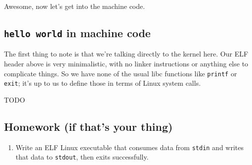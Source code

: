 \documentclass{article}
\begin{document}
  Awesome, now let's get into the machine code.

  \subsection{{\tt hello world} in machine code}
  The first thing to note is that we're talking directly to the kernel here. Our
  ELF header above is very minimalistic, with no linker instructions or anything
  else to complicate things. So we have none of the usual libc functions like
  {\tt printf} or {\tt exit}; it's up to us to define those in terms of Linux
  system calls.

  TODO

  \subsection{Homework (if that's your thing)}
  \begin{enumerate}
    \item Write an ELF Linux executable that consumes data from {\tt stdin} and
          writes that data to {\tt stdout}, then exits successfully.
  \end{enumerate}
\end{document}
